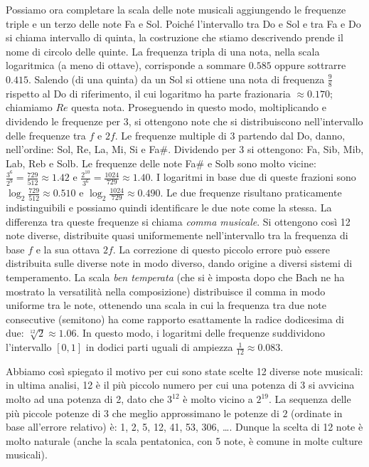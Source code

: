 Possiamo ora completare la scala delle note musicali aggiungendo le frequenze 
triple e un terzo delle note Fa e Sol. 
Poiché l’intervallo tra Do e Sol e tra Fa e Do si chiama intervallo di quinta, 
la costruzione che stiamo descrivendo prende il nome di circolo delle quinte.
La frequenza tripla di una nota, nella scala logaritmica (a meno di ottave), 
corrisponde a sommare $0.585$ oppure sottrarre $0.415$. 
Salendo (di una quinta) da un Sol si ottiene una nota di frequenza $\frac 9 8$ 
rispetto al Do di riferimento, il cui logaritmo ha parte frazionaria $\approx 0.170$; 
chiamiamo $Re$ questa nota. Proseguendo in questo modo, moltiplicando e dividendo 
le frequenze per $3$, si ottengono note che si distribuiscono nell’intervallo 
delle frequenze tra $f$ e $2f$. 
Le frequenze multiple di $3$ partendo dal Do, danno, nell’ordine: 
Sol, Re, La, Mi, Si e Fa\#. 
Dividendo per 3 si ottengono: Fa, Sib, Mib, Lab, Reb e Solb.
Le frequenze delle note Fa\# e Solb sono molto vicine: 
$\frac{3^6}{2^9} = \frac{729}{512} \approx 1.42$ e 
$\frac{2^{10}}{3^6} = \frac{1024}{729} \approx 1.40$. 
I logaritmi in base due di queste frazioni sono $\log_2 \frac{729}{512} \approx 0.510$ 
e $\log_2 \frac{1024}{729} \approx 0.490$. 
Le due frequenze risultano praticamente indistinguibili e possiamo quindi 
identificare le due note come la stessa. 
La differenza tra queste frequenze si chiama \emph{comma musicale}.
Si ottengono così 12 note diverse, distribuite quasi uniformemente nell’intervallo 
tra la frequenza di base $f$ e la sua ottava $2f$. 
La correzione di questo piccolo errore può essere distribuita sulle diverse note 
in modo diverso, dando origine a diversi sistemi di temperamento.
La scala \emph{ben temperata} (che si è imposta dopo che Bach ne ha mostrato 
la versatilità nella composizione) distribuisce il comma in modo uniforme 
tra le note, ottenendo una scala in cui la frequenza tra due note consecutive 
(semitono) ha come rapporto esattamente la radice dodicesima di due: 
$\sqrt[12]{2}\approx 1.06$. 
In questo modo, i logaritmi delle frequenze suddividono l’intervallo $[0,1]$ 
in dodici parti uguali di ampiezza $\frac 1 {12} \approx 0.083$.


Abbiamo così spiegato il motivo per cui sono state scelte 12 diverse note musicali: 
in ultima analisi, 12 è il più piccolo numero per cui una potenza di 3 si avvicina 
molto ad una potenza di 2, dato che $3^{12}$ è molto vicino a $2^{19}$. 
La sequenza delle più piccole potenze di $3$ che meglio approssimano le potenze 
di $2$ (ordinate in base all'errore relativo) è: 
1, 2, 5, 12, 41, 53, 306, \dots. 
Dunque la scelta di 12 note è molto naturale 
(anche la scala pentatonica, con 5 note, è comune in molte culture musicali).


